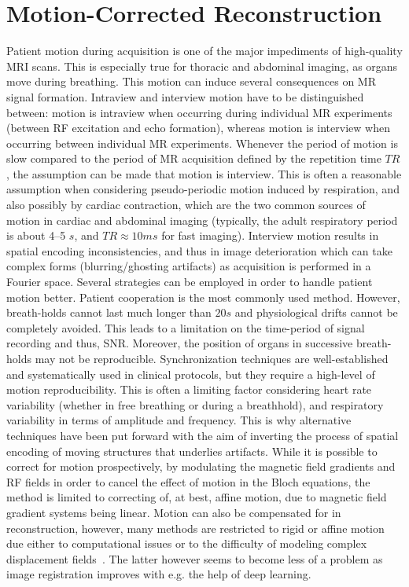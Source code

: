 \documentclass[english,version-2022-01]{uzl-thesis} %
\begin{document}
\section{Motion-Corrected Reconstruction} \label{Sec:ReconstructionPipeline}
Patient motion during acquisition is one of the major impediments of high-quality MRI scans. This is especially true for thoracic and abdominal imaging, as organs move during breathing. This motion can induce several consequences on MR signal formation. Intraview and interview motion have to be distinguished between: motion is intraview when occurring during individual MR experiments (between RF excitation and echo formation), whereas motion is interview when occurring between individual MR experiments. Whenever the period of motion is slow compared to the period of MR acquisition defined by the repetition time $TR$, the assumption can be made that motion is interview. This is often a reasonable assumption when considering pseudo-periodic motion induced by respiration, and also possibly by cardiac contraction, which are the two common sources of motion in cardiac and abdominal imaging (typically, the adult respiratory period is about 4–5 $s$, and $TR \approx 10 ms$ for fast imaging). Interview motion results in spatial encoding inconsistencies, and thus in image deterioration which can take complex forms (blurring/ghosting artifacts) as acquisition is performed in a Fourier space. Several strategies can be employed in order to handle patient motion better. Patient cooperation is the most commonly used method. However, breath-holds cannot last much longer than $20 s$ and physiological drifts cannot be completely avoided. This leads to a limitation on the time-period of signal recording and thus, SNR. Moreover, the position of organs in successive breath-holds may not be reproducible. Synchronization techniques are well-established and systematically used in clinical protocols, but they require a high-level of motion reproducibility. This is often a limiting factor considering heart rate variability (whether in free breathing or during a breathhold), and respiratory variability in terms of amplitude and frequency. This is why alternative techniques have been put forward with the aim of inverting the process of spatial encoding of moving structures that underlies artifacts. While it is possible to correct for motion prospectively, by modulating the magnetic field gradients and RF fields in order to cancel the effect of motion in the Bloch equations, the method is limited to correcting of, at best, affine motion, due to magnetic field gradient systems being linear. Motion can also be compensated for in reconstruction, however, many methods are restricted to rigid or affine motion due either to computational issues or to the difficulty of modeling complex displacement fields~\cite{GRICS}. The latter however seems to become less of a problem as image registration improves with e.g. the help of deep learning.\\
\end{document}
